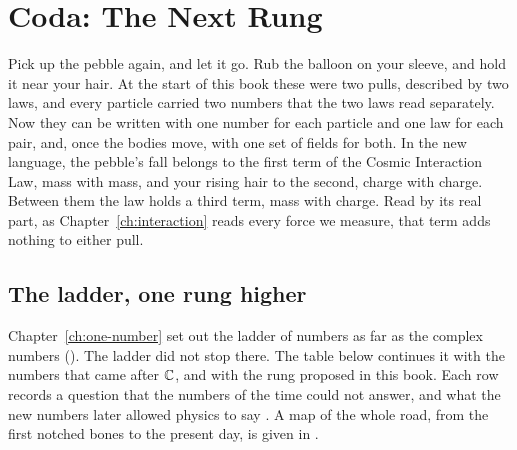 \chapter*{Coda: The Next Rung}\label{ch:coda}


Pick up the pebble again, and let it go. Rub the balloon on your sleeve, and hold it near your hair. At the start of this book these were two pulls, described by two laws, and every particle carried two numbers that the two laws read separately. Now they can be written with one number for each particle and one law for each pair, and, once the bodies move, with one set of fields for both. In the new language, the pebble's fall belongs to the first term of the Cosmic Interaction Law, mass with mass, and your rising hair to the second, charge with charge. Between them the law holds a third term, mass with charge. Read by its real part, as Chapter~\ref{ch:interaction} reads every force we measure, that term adds nothing to either pull.

\section*{The ladder, one rung higher}
{}

Chapter~\ref{ch:one-number} set out the ladder of numbers as far as the complex numbers (). The ladder did not stop there. The table below continues it with the numbers that came after $\mathbb{C}$, and with the rung proposed in this book. Each row records a question that the numbers of the time could not answer, and what the new numbers later allowed physics to say \citep{Kline1972,Baez2002}. A map of the whole road, from the first notched bones to the present day, is given in .

